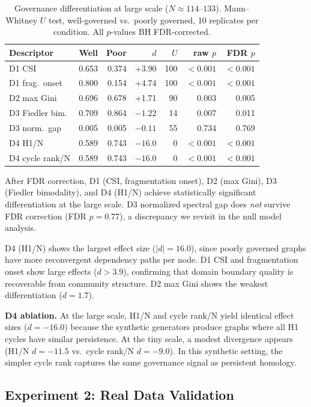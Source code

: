 \documentclass[11pt,a4paper]{article}
\begin{document}
\begin{table}[htb]
\centering
\caption{Governance differentiation at large scale ($N \approx 114$--$133$).
  Mann--Whitney $U$ test, well-governed vs.\ poorly governed,
  10 replicates per condition. All $p$-values BH FDR-corrected.}
\label{tab:exp1}
\begin{tabular}{lrrrrrr}
\toprule
Descriptor & Well & Poor & $d$ & $U$ & raw $p$ & FDR $p$ \\
\midrule
D1 CSI & 0.653 & 0.374 & +3.90 & 100 & $< 0.001$ & $< 0.001$ \\
D1 frag.\ onset & 0.800 & 0.154 & +4.74 & 100 & $< 0.001$ & $< 0.001$ \\
D2 max Gini & 0.696 & 0.678 & +1.71 & 90 & 0.003 & 0.005 \\
D3 Fiedler bim. & 0.709 & 0.864 & $-1.22$ & 14 & 0.007 & 0.011 \\
D3 norm.\ gap & 0.005 & 0.005 & $-0.11$ & 55 & 0.734 & 0.769 \\
D4 H1/N & 0.589 & 0.743 & $-16.0$ & 0 & $< 0.001$ & $< 0.001$ \\
D4 cycle rank/N & 0.589 & 0.743 & $-16.0$ & 0 & $< 0.001$ & $< 0.001$ \\
\bottomrule
\end{tabular}
\end{table}

After FDR correction, D1 (CSI, fragmentation onset), D2 (max Gini),
D3 (Fiedler bimodality), and D4 (H1/N) achieve statistically
significant differentiation at the large scale. D3 normalized spectral
gap does \emph{not} survive FDR correction (FDR $p = 0.77$), a
discrepancy we revisit in the null model analysis.

D4 (H1/N) shows the largest effect size ($|d| = 16.0$), since poorly
governed graphs have more reconvergent dependency paths per node.
D1 CSI and fragmentation onset show large effects ($d > 3.9$),
confirming that domain boundary quality is recoverable from community
structure. D2 max Gini shows the weakest differentiation ($d = 1.7$).

\textbf{D4 ablation.} At the large scale, H1/N and cycle rank/N yield
identical effect sizes ($d = -16.0$) because the synthetic generators
produce graphs where all H1 cycles have similar persistence. At the
tiny scale, a modest divergence appears (H1/N $d = -11.5$ vs.\ cycle
rank/N $d = -9.0$). In this synthetic setting, the simpler cycle rank
captures the same governance signal as persistent homology.

\subsection{Experiment 2: Real Data Validation}
\end{document}
